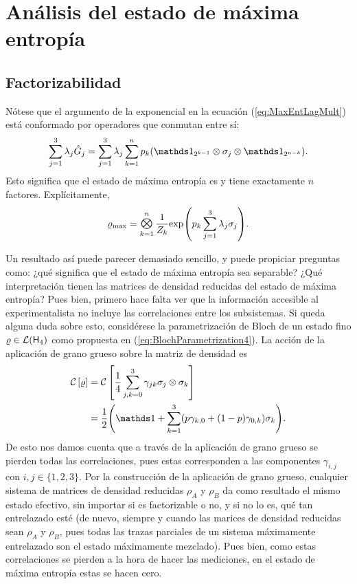 \section{Análisis del estado de máxima entropía}

\subsection{Factorizabilidad}

Nótese que el argumento de la exponencial en la ecuación (\ref{eq:MaxEntLagMult}) está conformado por operadores que conmutan entre sí:
\begin{equation}
    \sum_{j=1}^{3}\lambda_{j}\hat{G}_{j}=\sum_{j=1}^{3}\lambda_{j}\sum_{k=1}^{n}p_{k}(\Id_{2^{k-1}}\otimes\sigma_{j}\otimes\Id_{2^{n-k}}).\nonumber
\end{equation}
Esto significa que el estado de máxima entropía es   y tiene exactamente $n$ factores. Explícitamente,
\begin{equation}\label{eq:MaxEntSeparable}
    \varrho_{\max}=\Motimes_{k=1}^{n}\frac{1}{Z_{k}}\text{exp}\qty(p_{k}\sum_{j=1}^{3}\lambda_{j}\sigma_{j}).
\end{equation}

Un resultado así puede parecer demasiado sencillo, y puede propiciar preguntas como: ¿qué significa que el estado de máxima entropía sea separable? ¿Qué interpretación tienen las matrices de densidad reducidas del estado de máxima entropía? Pues bien, primero hace falta ver que la información accesible al experimentalista no incluye las correlaciones entre los subsistemas. Si queda alguna duda sobre esto, considérese la parametrización de Bloch de un estado fino $\varrho\in\mathcal{L}({\sf H}_{4})$ como propuesta en (\ref{eq:BlochParametrization4}). La acción de la aplicación de grano grueso sobre la matriz de densidad es
\begin{align}
    \CG{\varrho}&=\CG{\frac{1}{4}\sum_{j,k=0}^{3}\gamma_{jk}\pauli{j}\otimes \pauli{k}}\nonumber\\
    &=\frac{1}{2}\qty(\Id+\sum_{k=1}^{3}(p\gamma_{k,0}+(1-p)\gamma_{0,k})\sigma_{k}).\nonumber
\end{align}
De esto nos damos cuenta que a través de la aplicación de grano grueso se pierden todas las correlaciones, pues estas corresponden a las componentes $\gamma_{i,j}$ con $i,j\in\{1,2,3\}$. Por la construcción de la aplicación de grano grueso, cualquier sistema de matrices de densidad reducidas $\rho_{A}$ y $\rho_{B}$ da como resultado el mismo estado efectivo, sin importar si es factorizable o no, y si no lo es, qué tan entrelazado esté (de nuevo, siempre y cuando las marices de densidad reducidas sean $\rho_{A}$ y $\rho_{B}$, pues todas las trazas parciales de un sistema máximamente entrelazado son el estado máximamente mezclado). Pues bien, como estas correlaciones se pierden a la hora de hacer las mediciones, en el estado de máxima entropía estas se hacen cero. 

